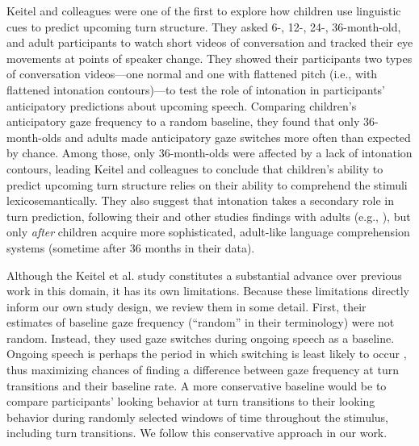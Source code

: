 \documentclass[authoryear, 12pt]{elsarticle}
\begin{document}

Keitel and colleagues \citeyearpar{keitel2013} were one of the first to explore how children use linguistic cues to predict upcoming turn structure. They asked 6-, 12-, 24-, 36-month-old, and adult participants to watch short videos of conversation and tracked their eye movements at points of speaker change. They showed their participants two types of conversation videos---one normal and one with flattened pitch (i.e., with flattened intonation contours)---to test the role of intonation in participants' anticipatory predictions about upcoming speech. Comparing children's anticipatory gaze frequency to a random baseline, they found that only 36-month-olds and adults made anticipatory gaze switches more often than expected by chance. Among those, only 36-month-olds were affected by a lack of intonation contours, leading Keitel and colleagues to conclude that children's ability to predict upcoming turn structure relies on their ability to comprehend the stimuli lexicosemantically. They also suggest that intonation takes a secondary role in turn prediction, following their and other studies findings with adults (e.g., \citealp{de-ruiter2006}), but only \textit{after} children acquire more sophisticated, adult-like language comprehension systems (sometime after 36 months in their data).

Although the Keitel et al. \citeyearpar{keitel2013} study constitutes a substantial advance over previous work in this domain, it has its own limitations. Because these limitations directly inform our own study design, we review them in some detail. First, their estimates of baseline gaze frequency (``random'' in their terminology) were not random. Instead, they used gaze switches during ongoing speech as a baseline. Ongoing speech is perhaps the period in which switching is least likely to occur \citep{hirvenkari2013}, thus maximizing chances of finding a difference between gaze frequency at turn transitions and their baseline rate. A more conservative baseline would be to compare participants' looking behavior at turn transitions to their looking behavior during randomly selected windows of time throughout the stimulus, including turn transitions. We follow this conservative approach in our work. 
\end{document}
